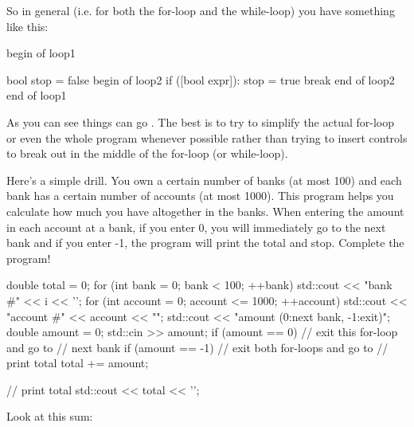 So in general (i.e. for both the for-loop and the while-loop) you have
something like this:
\begin{console}
begin of loop1

      bool stop = false
      begin of loop2
           if ([bool expr]):
               stop = true
               break
      end of loop2
end of loop1 
\end{console}

As you can see things can go . The best is to try to
simplify the actual for-loop or even the whole program whenever possible
rather than trying to insert controls to break out in the middle of the
for-loop (or while-loop).

\begin{ex} Here's a simple drill. You own a
certain number of banks (at most 100) and each bank has a certain number
of accounts (at most 1000). This program helps you calculate how much
you have altogether in the banks. When entering the amount in each
account at a bank, if you enter 0, you will immediately go to the next
bank and if you enter -1, the program will print the total and stop.
Complete the program!

\begin{console}
double total = 0;
for (int bank = 0; bank < 100; ++bank)
{   
    std::cout << "bank #" << i << '\n';
    for (int account = 0; account <= 1000; ++account)
    {   
        std::cout << "account #" << account << "\n";
        std::cout << "amount (0:next bank, -1:exit)";
        double amount = 0;
        std::cin >> amount;
        if (amount == 0)
        {  
           // exit this for-loop and go to
           // next bank
        }
        if (amount == -1)
        {  
           // exit both for-loops and go to
           // print total
        }
        total += amount;
     }
}

// print total
std::cout << total << '\n'; 
\end{console}
\end{ex}
\newpage{}

Look at this sum:

\\
\\
\\


